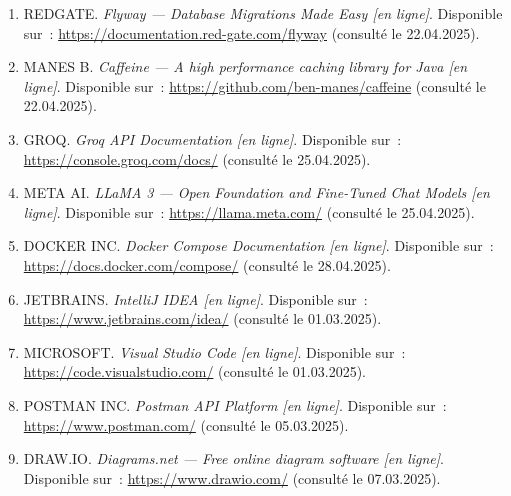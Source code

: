 \begin{enumerate}
  \item REDGATE.
        \textit{Flyway — Database Migrations Made Easy [en ligne]}.
        Disponible sur~: \url{https://documentation.red-gate.com/flyway}
        (consulté le 22.04.2025).

  \item MANES B.
        \textit{Caffeine — A high performance caching library for Java [en ligne]}.
        Disponible sur~: \url{https://github.com/ben-manes/caffeine}
        (consulté le 22.04.2025).

  \item GROQ.
        \textit{Groq API Documentation [en ligne]}.
        Disponible sur~: \url{https://console.groq.com/docs/}
        (consulté le 25.04.2025).

  \item META AI.
        \textit{LLaMA 3 — Open Foundation and Fine-Tuned Chat Models [en ligne]}.
        Disponible sur~: \url{https://llama.meta.com/}
        (consulté le 25.04.2025).

  \item DOCKER INC.
        \textit{Docker Compose Documentation [en ligne]}.
        Disponible sur~: \url{https://docs.docker.com/compose/}
        (consulté le 28.04.2025).

  \item JETBRAINS.
        \textit{IntelliJ IDEA [en ligne]}.
        Disponible sur~: \url{https://www.jetbrains.com/idea/}
        (consulté le 01.03.2025).

  \item MICROSOFT.
        \textit{Visual Studio Code [en ligne]}.
        Disponible sur~: \url{https://code.visualstudio.com/}
        (consulté le 01.03.2025).

  \item POSTMAN INC.
        \textit{Postman API Platform [en ligne]}.
        Disponible sur~: \url{https://www.postman.com/}
        (consulté le 05.03.2025).

  \item DRAW.IO.
        \textit{Diagrams.net — Free online diagram software [en ligne]}.
        Disponible sur~: \url{https://www.drawio.com/}
        (consulté le 07.03.2025).


\end{enumerate}
